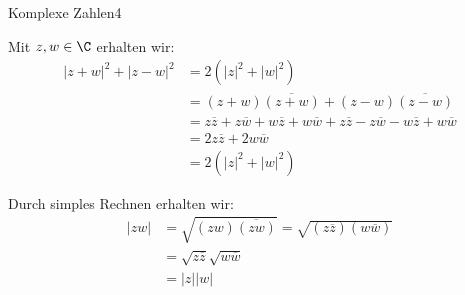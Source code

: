 \begin{aufgabe}{Komplexe Zahlen}{4}
\begin{aufgaben}
    \item Mit $z, w \in \C$ erhalten wir: \begin{align*}
        |z+w|^2 + |z-w|^2 &= 2(|z|^2 + |w|^2) \\
            &= (z+w)\overline{(z+w)} + (z-w)\overline{(z-w)} \\
            &= z \overline{z} + z \overline{w} + w \overline{z} + w \overline{w} + z \overline{z} - z \overline{w} - w \overline{z} + w \overline{w}\\
            &= 2 z \overline{z} + 2 w \overline{w}\\
            &= 2 (|z|^2 + |w|^2)
    \end{align*}
    \item Durch simples Rechnen erhalten wir: \begin{align*}
        |zw| &= \sqrt{(zw)\overline{(zw)}} = \sqrt{(z \overline{z})(w \overline{w})} \\
             &= \sqrt{z \overline{z}} \sqrt{w \overline{w}} \\
             &= |z||w|
    \end{align*}
\end{aufgaben}
\end{aufgabe}

